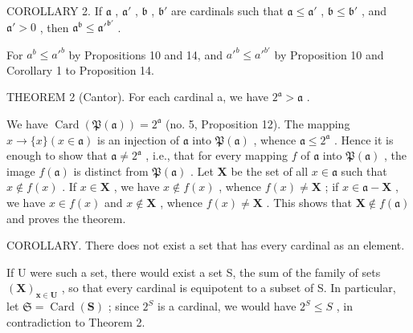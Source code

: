 COROLLARY 2. If \(\mathfrak{a}\) , \(\mathfrak{a}'\) , \(\mathfrak{b}\) , \(\mathfrak{b}'\) are cardinals such that \(\mathfrak{a} \leqslant \mathfrak{a}'\) , \(\mathfrak{b} \leqslant \mathfrak{b}'\) , and \(\mathfrak{a}' > 0\) , then \(\mathfrak{a}^{\mathfrak{b}} \leqslant {\mathfrak{a}'}^{\mathfrak{b}'}\) .

For \(a^b \leqslant a'^b\) by Propositions 10 and 14, and \(a'^b \leqslant a'^{b'}\) by Proposition 10 and Corollary 1 to Proposition 14.

THEOREM 2 (Cantor). For each cardinal a, we have \(2^{\mathfrak{a}} > \mathfrak{a}\) .

We have \(\operatorname{Card}(\mathfrak{P}(\mathfrak{a})) = 2^{\mathfrak{a}}\) (no. 5, Proposition 12). The mapping \(x \to \{x\} (x \in \mathfrak{a})\) is an injection of \(\mathfrak{a}\) into \(\mathfrak{P}(\mathfrak{a})\) , whence \(\mathfrak{a} \leqslant 2^{\mathfrak{a}}\) . Hence it is enough to show that \(\mathfrak{a} \neq 2^{\mathfrak{a}}\) , i.e., that for every mapping \(f\) of \(\mathfrak{a}\) into \(\mathfrak{P}(\mathfrak{a})\) , the image \(f(\mathfrak{a})\) is distinct from \(\mathfrak{P}(\mathfrak{a})\) . Let \(\mathbf{X}\) be the set of all \(x \in \mathfrak{a}\) such that \(x \notin f(x)\) . If \(x \in \mathbf{X}\) , we have \(x \notin f(x)\) , whence \(f(x) \neq \mathbf{X}\) ; if \(x \in \mathfrak{a} - \mathbf{X}\) , we have \(x \in f(x)\) and \(x \notin \mathbf{X}\) , whence \(f(x) \neq \mathbf{X}\) . This shows that \(\mathbf{X} \notin f(\mathfrak{a})\) and proves the theorem.

COROLLARY. There does not exist a set that has every cardinal as an element.

If U were such a set, there would exist a set S, the sum of the family of sets \((\mathbf{X})_{\mathbf{x}\in\mathbf{U}}\) , so that every cardinal is equipotent to a subset of S. In particular, let \(\mathfrak{S}=\operatorname{Card}(\mathbf{S})\) ; since \(2^{S}\) is a cardinal, we would have \(2^{S}\leqslant S\) , in contradiction to Theorem 2.

